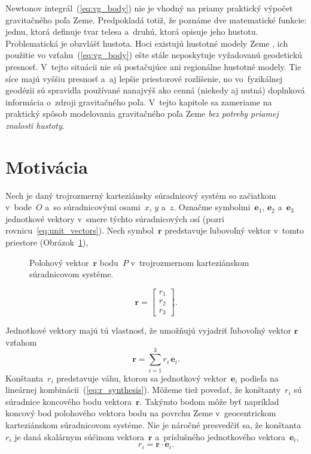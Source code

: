 \documentclass[a4paper,12pt]{book}
\let\vec\mathbf
\begin{document}
Newtonov integrál~(\ref{eq:vg_body}) nie je vhodný na priamy praktický výpočet 
gravitačného poľa Zeme.  Predpokladá totiž, že poznáme dve matematické funkcie: 
jednu, ktorá definuje tvar telesa a~druhú, ktorá opisuje jeho hustotu.  
Problematická je obzvlášť hustota.  Hoci existujú hustotné modely Zeme 
\parencite[napríklad][]{Dziewonski1981}, ich použitie vo 
vzťahu~(\ref{eq:vg_body}) ešte stále neposkytuje vyžadovanú geodetickú 
presnosť.  V~tejto situácii nie sú postačujúce ani regionálne hustotné modely.  
Tie síce majú vyššiu presnosť a~aj lepšie priestorové rozlíšenie, no 
vo~fyzikálnej geodézii sú spravidla používané nanajvýš ako cenná (niekedy aj 
nutná) doplnková informácia o~zdroji gravitačného poľa.  V~tejto kapitole sa 
zameriame na praktický spôsob modelovania gravitačného poľa Zeme \emph{bez 
potreby priamej znalosti hustoty}.






\section{Motivácia}
\label{sec:sh_motivation}

Nech je daný trojrozmerný karteziánsky súradnicový systém so začiatkom 
v~bode~$O$ a~so súradnicovými osami~$x$, $y$ a~$z$.  Označme symbolmi~$\vec 
e_1$, $\vec e_2$ a~$\vec e_3$ jednotkové vektory v~smere týchto súradnicových 
osí (pozri rovnicu~\ref{eq:unit_vectors}).  Nech symbol~$\vec r$ predstavuje 
ľubovoľný vektor v~tomto priestore (Obrázok~\ref{fig:unit_vectors}),
%
\begin{figure}
\centering

\caption{Polohový vektor~$\vec r$ bodu~$P$ v~trojrozmernom karteziánskom 
súradnicovom systéme.}
\label{fig:unit_vectors}
\end{figure}

\begin{equation}
\vec r =
\begin{bmatrix}
r_1\\
r_2\\
r_3
\end{bmatrix}
{.}
\end{equation}

Jednotkové vektory majú tú vlastnosť, že umožňujú vyjadriť ľubovoľný vektor
$\vec r$ vzťahom
%
\begin{equation}
\label{eq:r_synthesis}
\vec r = \sum_{i = 1}^3 r_i \, \vec e_i{.}
\end{equation}
%
Konštanta~$r_i$ predstavuje váhu, ktorou sa jednotkový vektor~$\vec e_i$ 
podieľa na lineárnej kombinácii~(\ref{eq:r_synthesis}).  Môžeme tiež povedať, 
že konštanty~$r_i$ sú súradnice koncového bodu vektora~$\vec r$.  Takýmto bodom 
môže byť napríklad koncový bod polohového vektora bodu na povrchu Zeme 
v~geocentrickom karteziánskom súradnicovom systéme.  Nie je náročné presvedčiť 
sa, že konštanta~$r_i$ je daná skalárnym súčinom vektora~$\vec r$ a~príslušného 
jednotkového vektora~$\vec e_i$,
%
\begin{equation}
\label{eq:r_analysis}
r_i = \vec r \cdot \vec e_i{.}
\end{equation}
\end{document}
